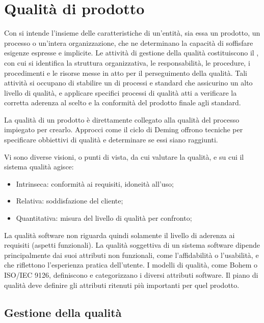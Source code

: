 \section{Qualità di prodotto}

Con  si intende l'insieme delle caratteristiche di un'entità,
sia essa un prodotto, un processo o un'intera organizzazione, che ne determinano
la capacità di soffisfare esigenze espresse e implicite. Le attività di gestione
della qualità costituiscono il , con cui si identifica
la struttura organizzativa, le responsabilità, le procedure, i procedimenti e le
risorse messe in atto per il perseguimento della qualità. Tali attività  si
occupano di stabilire un  di processi e standard che
assicurino un alto livello di qualità, e applicare specifici processi di qualità
atti a verificare la corretta aderenza al  scelto e la
conformità del prodotto finale agli standard.

La qualità di un prodotto è direttamente collegato alla qualità del processo
impiegato per crearlo. Approcci come il ciclo di Deming offrono tecniche per
specificare obbiettivi di qualità e determinare se essi siano raggiunti.

Vi sono diverse visioni, o punti di vista, da cui valutare la qualità, e su cui
il sistema qualità agisce:

\begin{itemize}
  \item Intrinseca: conformità ai requisiti, idoneità all'uso;
  \item Relativa: soddisfazione del cliente;
  \item Quantitativa: misura del livello di qualità per confronto;
\end{itemize}

La qualità software non riguarda quindi solamente il livello di aderenza ai
requisiti (aspetti funzionali). La qualità soggettiva di un sistema software
dipende principalmente dai suoi attributi non funzionali, come l'affidabilità o
l'usabilità, e che riflettono l'esperienza pratica dell'utente. I modelli di
qualità, come Bohem o ISO/IEC 9126, definiscono e categorizzano i diversi
attributi software. Il piano di qualità deve definire gli attributi ritenuti più
importanti per quel prodotto.

\subsection{Gestione della qualità}

